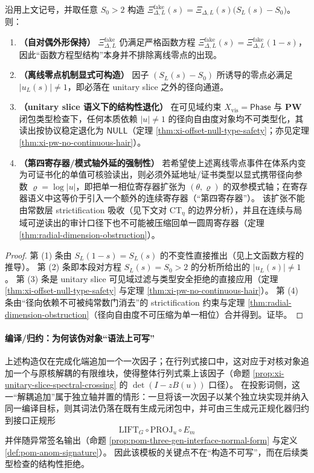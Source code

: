 \begin{proposition}\label{prop:xi-offcritical-constructible-but-null-or-extra-register}
沿用上文记号，并取任意 \(S_0>2\) 构造
\(
\Xi^{\mathrm{fake}}_{\Delta,L}(s)=\Xi_{\Delta,L}(s)\bigl(S_L(s)-S_0\bigr)
\)。
则：
\begin{enumerate}
  \item \textbf{（自对偶外形保持）}
  \(\Xi^{\mathrm{fake}}_{\Delta,L}\) 仍满足严格函数方程 \(\Xi^{\mathrm{fake}}_{\Delta,L}(s)=\Xi^{\mathrm{fake}}_{\Delta,L}(1-s)\)，因此“函数方程型结构”本身并不排除离线零点的出现。
  \item \textbf{（离线零点机制显式可构造）}
  因子 \((S_L(s)-S_0)\) 所诱导的零点必满足 \(|u_L(s)|\neq 1\)，即必落在 unitary slice 之外的径向通道。
  \item \textbf{（unitary slice 语义下的结构性退化）}
  在可见域约束 \(X_{\mathrm{vis}}=\mathsf{Phase}\) 与 \(\mathbf{PW}\) 闭包类型检查下，任何本质依赖 \(|u|\neq 1\) 的径向自由度对象均不可类型化，其读出按协议稳定退化为 \(\mathsf{NULL}\)（定理 \ref{thm:xi-offset-null-type-safety}；亦见定理 \ref{thm:xi-pw-no-continuous-hair}）。
  \item \textbf{（第四寄存器/模式轴外延的强制性）}
  若希望使上述离线零点事件在体系内变为可证书化的单值可核验读出，则必须外延地址/证书类型以显式携带径向参数 \(\varrho=\log|u|\)，即把单一相位寄存器扩张为 \((\theta,\varrho)\) 的双参模式轴；在寄存器语义中这等价于引入一个额外的连续寄存器（“第四寄存器”）。
  该扩张不能由常数层 strictification 吸收（见下文对 \(\mathrm{CT}_\eta\) 的边界分析），并且在连续与局域可逆读出的审计口径下也不可能被压缩回单一圆周寄存器（定理 \ref{thm:radial-dimension-obstruction}）。
\end{enumerate}
\end{proposition}

\begin{proof}
第 (1) 条由 \(S_L(1-s)=S_L(s)\) 的不变性直接推出（见上文函数方程的推导）。
第 (2) 条即本段对方程 \(S_L(s)=S_0>2\) 的分析所给出的 \(|u_L(s)|\neq 1\)。
第 (3) 条是 unitary slice 可见域过滤与类型安全拒绝的直接应用（定理 \ref{thm:xi-offset-null-type-safety} 与定理 \ref{thm:xi-pw-no-continuous-hair}）。
第 (4) 条由“径向依赖不可被纯常数门消去”的 strictification 约束与定理 \ref{thm:radial-dimension-obstruction}（径向自由度不可压缩为单一相位）合并得到。证毕。
\end{proof}

\paragraph{编译/归约：为何该伪对象“语法上可写”}
上述构造仅在完成化端追加一个一次因子；在行列式接口中，这对应于对核对象追加一个与原核解耦的有限维块，使得整体行列式乘上该因子（命题 \ref{prop:xi-unitary-slice-spectral-crossing} 的 \(\det(I-zB(u))\) 口径）。
在投影词侧，这一“解耦追加”属于独立轴并置的情形：一旦将该一次因子以某个独立块实现并纳入同一编译目标，则其词法仍落在既有生成元闭包中，并可由三生成元正规化器归约到接口正规形
\[
\mathrm{LIFT}_G\circ \mathrm{PROJ}_u\circ E_m
\]
并伴随异常签名输出（命题 \ref{prop:pom-three-gen-interface-normal-form} 与定义 \ref{def:pom-anom-signature}）。
因此该模板的关键点不在“构造不可写”，而在后续类型检查的结构性拒绝。

